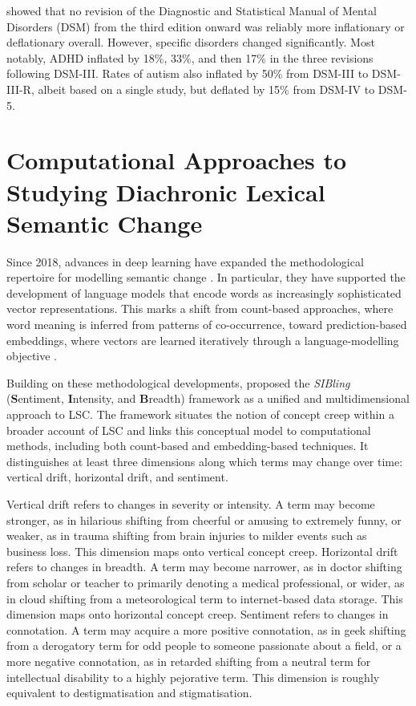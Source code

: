 \citet{fabianoDiagnosticInflationDSM2020} showed that no revision of the Diagnostic and Statistical Manual of Mental Disorders (DSM) from the third edition onward was reliably more inflationary or deflationary overall. However, specific disorders changed significantly. Most notably, ADHD inflated by 18\%, 33\%, and then 17\% in the three revisions following DSM-III. Rates of autism also inflated by 50\% from DSM-III to DSM-III-R, albeit based on a single study, but deflated by 15\% from DSM-IV to DSM-5.

\section{Computational Approaches to Studying Diachronic Lexical Semantic Change}

Since 2018, advances in deep learning have expanded the methodological repertoire for modelling semantic change \citep{manningHumanLanguageUnderstanding2022}. In particular, they have supported the development of language models that encode words as increasingly sophisticated vector representations. This marks a shift from count-based approaches, where word meaning is inferred from patterns of co-occurrence, toward prediction-based embeddings, where vectors are learned iteratively through a language-modelling objective \citep{grimmerTextDataNew2022,jm3}.

Building on these methodological developments, \citet{baesMultidimensionalFrameworkEvaluating2024} proposed the \textit{SIBling} (\textbf{S}entiment, \textbf{I}ntensity, and \textbf{B}readth) framework as a unified and multidimensional approach to LSC. The framework situates the notion of concept creep within a broader account of LSC and links this conceptual model to computational methods, including both count-based and embedding-based techniques. It distinguishes at least three dimensions along which terms may change over time: vertical drift, horizontal drift, and sentiment.

Vertical drift refers to changes in severity or intensity. A term may become stronger, as in hilarious shifting from cheerful or amusing to extremely funny, or weaker, as in trauma shifting from brain injuries to milder events such as business loss. This dimension maps onto vertical concept creep. Horizontal drift refers to changes in breadth. A term may become narrower, as in doctor shifting from scholar or teacher to primarily denoting a medical professional, or wider, as in cloud shifting from a meteorological term to internet-based data storage. This dimension maps onto horizontal concept creep. Sentiment refers to changes in connotation. A term may acquire a more positive connotation, as in geek shifting from a derogatory term for odd people to someone passionate about a field, or a more negative connotation, as in retarded shifting from a neutral term for intellectual disability to a highly pejorative term. This dimension is roughly equivalent to destigmatisation and stigmatisation.

